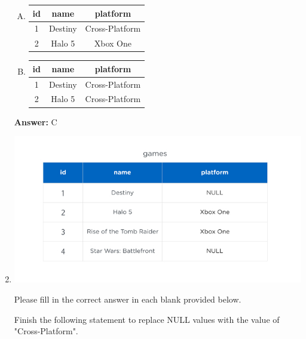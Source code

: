 \documentclass[12pt]{article}
\begin{document}
\begin{enumerate}[1.]
\begin{enumerate}[A.]
        \item

        \begin{tabular}{|c|c|c|}
        \hline
        id  &	name    &   platform\\
        \hline
        1   & 	Destiny &	Cross-Platform\\
        \hline
        2   &	Halo 5  &	Xbox One\\
        \hline
        \end{tabular}

        \item

        \begin{tabular}{|c|c|c|}
        \hline
        id  &	name    &	platform\\
        \hline
        1   &	Destiny &	Cross-Platform\\
        \hline
        2   &	Halo 5  &	Cross-Platform\\
        \hline
        \end{tabular}

    \end{enumerate}

    \bigskip

    \textbf{Answer:} C

    \item

    \begin{center}
    \includegraphics[width=0.8 \linewidth]{images/part_2_notes_2.png}
    \end{center}

    \bigskip

    Please fill in the correct answer in each blank provided below.

    \bigskip

    Finish the following statement to replace NULL values with the value of "Cross-Platform".

    \bigskip


\end{enumerate}
\end{document}
